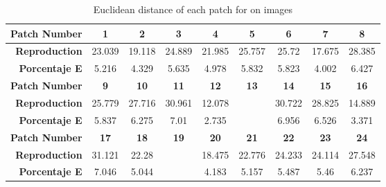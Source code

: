 \begin{table}[H]
  \caption{Euclidean distance of each patch for on images }
  \begin{center}
    \begin{tabularx}{\textwidth}{r c c c c c c c c}
    \toprule
        \textbf{Patch Number} & \textbf{1} & \textbf{2} & \textbf{3} & \textbf{4} & \textbf{5} & \textbf{6} & \textbf{7} & \textbf{8}\\ \midrule 
        \textbf{Reproduction} &23.039 &19.118 &24.889 &21.985 &25.757 &25.72 &17.675 &28.385\\ 
        \textbf{Porcentaje E} &5.216 &4.329 &5.635 &4.978 &5.832 &5.823 &4.002 &6.427\\ \midrule 
        \textbf{Patch Number} & \textbf{9} & \textbf{10} & \textbf{11} & \textbf{12} & \textbf{13} & \textbf{14} & \textbf{15} & \textbf{16}\\ \midrule 
        \textbf{Reproduction} &25.779 &27.716 &30.961 &12.078 &\cellcolor{colorred}{31.537} &30.722 &28.825 &14.889\\ 
        \textbf{Porcentaje E} &5.837 &6.275 &7.01 &2.735 &\cellcolor{colorred}{7.14} &6.956 &6.526 &3.371\\ \midrule 
        \textbf{Patch Number} & \textbf{17} & \textbf{18} & \textbf{19} & \textbf{20} & \textbf{21} & \textbf{22} & \textbf{23} & \textbf{24}\\ \midrule 
        \textbf{Reproduction} &31.121 &22.28 &\cellcolor{colorgreen}{5.415} &18.475 &22.776 &24.233 &24.114 &27.548\\ 
        \textbf{Porcentaje E} &7.046 &5.044 &\cellcolor{colorgreen}{1.226} &4.183 &5.157 &5.487 &5.46 &6.237\\ \midrule 
    \bottomrule
    \end{tabularx}
  \end{center}
\end{table}
